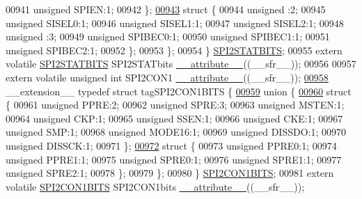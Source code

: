 \begin{DoxyCode}
00941       \textcolor{keywordtype}{unsigned} SPIEN:1;
00942     \};
\hypertarget{a00015_source_l00943}{}\hyperlink{a00015}{00943}     \textcolor{keyword}{struct }\{
00944       \textcolor{keywordtype}{unsigned} :2;
00945       \textcolor{keywordtype}{unsigned} SISEL0:1;
00946       \textcolor{keywordtype}{unsigned} SISEL1:1;
00947       \textcolor{keywordtype}{unsigned} SISEL2:1;
00948       \textcolor{keywordtype}{unsigned} :3;
00949       \textcolor{keywordtype}{unsigned} SPIBEC0:1;
00950       \textcolor{keywordtype}{unsigned} SPIBEC1:1;
00951       \textcolor{keywordtype}{unsigned} SPIBEC2:1;
00952     \};
00953   \};
00954 \} \hyperlink{a00014_dc/d5d/a00775}{SPI2STATBITS};
00955 \textcolor{keyword}{extern} \textcolor{keyword}{volatile} \hyperlink{a00014_dc/d5d/a00775}{SPI2STATBITS} SPI2STATbits \hyperlink{a00015_a493c46f03454991ccc5aa7a6e1dfb2a7}{\_\_attribute\_\_}((\_\_sfr\_\_));
00956 
00957 \textcolor{keyword}{extern} \textcolor{keyword}{volatile} \textcolor{keywordtype}{unsigned} \textcolor{keywordtype}{int}  SPI2CON1 \hyperlink{a00015_a493c46f03454991ccc5aa7a6e1dfb2a7}{\_\_attribute\_\_}((\_\_sfr\_\_));
\hypertarget{a00015_source_l00958}{}\hyperlink{a00014}{00958} \_\_extension\_\_ \textcolor{keyword}{typedef} \textcolor{keyword}{struct }tagSPI2CON1BITS \{
\hypertarget{a00015_source_l00959}{}\hyperlink{a00015}{00959}   \textcolor{keyword}{union }\{
\hypertarget{a00015_source_l00960}{}\hyperlink{a00015}{00960}     \textcolor{keyword}{struct }\{
00961       \textcolor{keywordtype}{unsigned} PPRE:2;
00962       \textcolor{keywordtype}{unsigned} SPRE:3;
00963       \textcolor{keywordtype}{unsigned} MSTEN:1;
00964       \textcolor{keywordtype}{unsigned} CKP:1;
00965       \textcolor{keywordtype}{unsigned} SSEN:1;
00966       \textcolor{keywordtype}{unsigned} CKE:1;
00967       \textcolor{keywordtype}{unsigned} SMP:1;
00968       \textcolor{keywordtype}{unsigned} MODE16:1;
00969       \textcolor{keywordtype}{unsigned} DISSDO:1;
00970       \textcolor{keywordtype}{unsigned} DISSCK:1;
00971     \};
\hypertarget{a00015_source_l00972}{}\hyperlink{a00015}{00972}     \textcolor{keyword}{struct }\{
00973       \textcolor{keywordtype}{unsigned} PPRE0:1;
00974       \textcolor{keywordtype}{unsigned} PPRE1:1;
00975       \textcolor{keywordtype}{unsigned} SPRE0:1;
00976       \textcolor{keywordtype}{unsigned} SPRE1:1;
00977       \textcolor{keywordtype}{unsigned} SPRE2:1;
00978     \};
00979   \};
00980 \} \hyperlink{a00014_dd/de5/a00771}{SPI2CON1BITS};
00981 \textcolor{keyword}{extern} \textcolor{keyword}{volatile} \hyperlink{a00014_dd/de5/a00771}{SPI2CON1BITS} SPI2CON1bits \hyperlink{a00015_a493c46f03454991ccc5aa7a6e1dfb2a7}{\_\_attribute\_\_}((\_\_sfr\_\_));

\end{DoxyCode}
